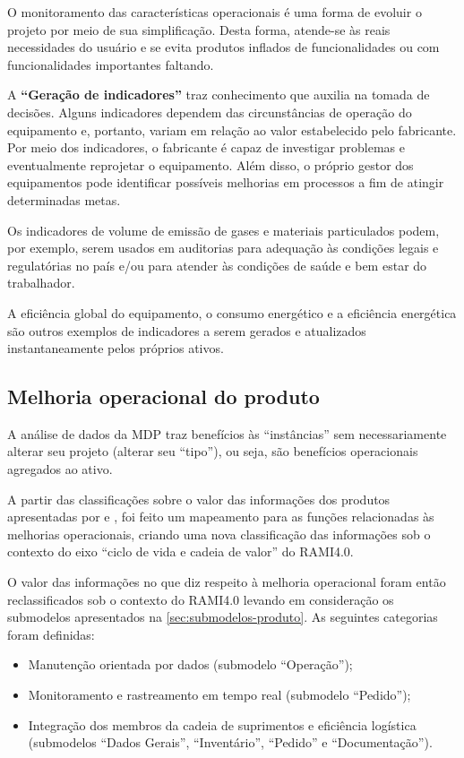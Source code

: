 O monitoramento das características operacionais é uma forma de evoluir o projeto por meio de sua simplificação. Desta forma, atende-se às reais necessidades do usuário e se evita produtos inflados de funcionalidades ou com funcionalidades importantes faltando.

A \textbf{``Geração de indicadores''} traz conhecimento que auxilia na tomada de decisões. Alguns indicadores dependem das circunstâncias de operação do equipamento e, portanto, variam em relação ao valor estabelecido pelo fabricante. Por meio dos indicadores, o fabricante é capaz de investigar problemas e eventualmente reprojetar o equipamento. Além disso, o próprio gestor dos equipamentos pode identificar possíveis melhorias em processos a fim de atingir determinadas metas.

Os indicadores de volume de emissão de gases e materiais particulados podem, por exemplo, serem usados em auditorias para adequação às condições legais e regulatórias no país e/ou para atender às condições de saúde e bem estar do trabalhador.

A eficiência global do equipamento, o consumo energético e a eficiência energética são outros exemplos de indicadores a serem gerados e atualizados instantaneamente pelos próprios ativos.

\subsection{Melhoria operacional do produto}
\label{subsec:melhoria-operacional}

A análise de dados da MDP traz benefícios às ``instâncias'' sem necessariamente alterar seu projeto (alterar seu ``tipo''), ou seja, são benefícios operacionais agregados ao ativo.

A partir das classificações sobre o valor das informações dos produtos apresentadas por  e , foi feito um mapeamento para as funções relacionadas às melhorias operacionais, criando uma nova classificação das informações sob o contexto do eixo ``ciclo de vida e cadeia de valor'' do RAMI4.0.

O valor das informações no que diz respeito à melhoria operacional foram então reclassificados sob o contexto do RAMI4.0 levando em consideração os submodelos apresentados na \autoref{sec:submodelos-produto}. As seguintes categorias foram definidas:

\begin{itemize}
	\item Manutenção orientada por dados (submodelo ``Operação'');
	\item Monitoramento e rastreamento em tempo real (submodelo ``Pedido'');
	\item Integração dos membros da cadeia de suprimentos e eficiência logística (submodelos ``Dados Gerais'', ``Inventário'', ``Pedido'' e ``Documentação'').
\end{itemize}

